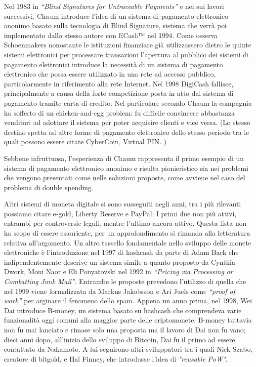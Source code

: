 Nel 1983 in \textit{“Blind Signatures for Untraceable Payments”} e nei sui lavori successivi\cite{K6,K7}, Chaum introduce l’idea di un sistema di pagamento elettronico anonimo basato sulla tecnologia di Blind Signature, sistema che verrà poi implementato dallo stesso autore con ECash™ nel 1994. Come osserva Schoenmakers\cite{K8} nonostante le istituzioni finanziare già utilizzassero dietro le quinte sistemi elettronici per processare transazioni l’apertura al pubblico dei sistemi di pagamento elettronici introduce la necessità di un sistema di pagamento elettronico che possa essere utilizzato in una rete ad accesso pubblico, particolarmente in riferimento alla rete Internet. Nel 1998 DigiCash fallisce, principalmente a causa della forte competizione posta in atto dal sistema di pagamento tramite carta di credito. Nel particolare secondo Chaum la compagnia ha sofferto di un chicken-and-egg problem: fu difficile convincere abbastanza venditori  ad adottare il sistema per  poter acquisire clienti e vice versa. (Lo stesso destino spetta ad altre forme di pagamento elettronico dello stesso periodo tra le quali possono essere citate CyberCoin, Virtual PIN. ) 


Sebbene infruttuosa, l’esperienza di Chaum rappresenta il primo esempio di un sistema di pagamento elettronico anonimo e risulta pionieristico sia nei problemi che vengono presentati come nelle soluzioni proposte, come avviene nel caso del problema di double spending. 


Altri sistemi di moneta digitale si sono susseguiti negli anni, tra i più rilevanti possiamo citare e-gold, Liberty Reserve e PayPal: I primi due non più attivi, entrambi per controversie legali, mentre l’ultimo ancora attivo. Questa lista non ha scopo di essere esauriente, per un approfondimento si rimanda alla letteratura relativa all'argomento.
Un altro tassello fondamentale nello sviluppo delle monete elettroniche è l’introduzione nel 1997 di hashcash\cite{K9} da parte di Adam Back che indipendentemente descrive un sistema simile a quanto proposto da Cynthia Dwork,  Moni Naor e Eli Ponyatovski nel 1992 in \textit{“Pricing via Processing or Combatting Junk Mail”}\cite{K10}. Entrambe le proposte prevedono l’utilizzo di quella che nel 1999 viene formalizzata da  Markus Jakobsson e Ari Juels come \textit{“proof of work”} per arginare il fenomeno dello spam\cite{K11}. Appena un anno prima, nel 1998, Wei Dai introduce B-money\cite{K12}, un sistema basato su hashcash che comprendeva varie funzionalità oggi comuni alla maggior parte delle criptomonete. B-money tuttavia non fu mai lanciato e rimase solo una proposta ma il lavoro di Dai non fu vano; dieci anni dopo, all'inizio dello sviluppo di Bitcoin, Dai fu il primo ad essere contattato da Nakamoto. A lui seguirono altri sviluppatori tra i quali Nick Szabo, creatore di bitgold, e Hal Finney, che introdusse l'idea di \textit{"reusable PoW"}\cite{K13}. 

